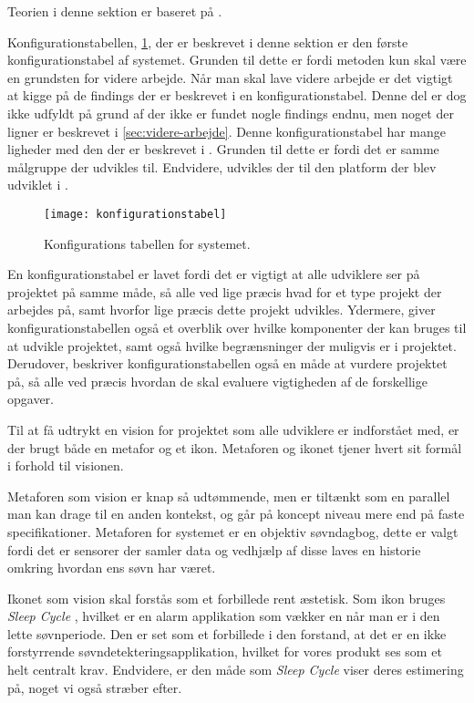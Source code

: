 Teorien i denne sektion er baseret på \citet{art:essence}.

Konfigurationstabellen, \cref{tab:konfigurationsTabel}, der er beskrevet i denne sektion er den første konfigurationstabel af systemet.
Grunden til dette er fordi metoden kun skal være en grundsten for videre arbejde.
Når man skal lave videre arbejde er det vigtigt at kigge på de findings der er beskrevet i en konfigurationstabel.
Denne del er dog ikke udfyldt på grund af der ikke er fundet nogle findings endnu, men noget der ligner er beskrevet i \cref{sec:videre-arbejde}.
Denne konfigurationstabel har mange ligheder med den der er beskrevet i \citet{misc:faellesrapp}.
Grunden til dette er fordi det er samme målgruppe der udvikles til.
Endvidere, udvikles der til den platform der blev udviklet i \citet{misc:faellesrapp}.

\begin{figure}[]
	\centering
	\texttt{[image: konfigurationstabel]}
	\caption{Konfigurations tabellen for systemet.}
	\label{tab:konfigurationsTabel}
\end{figure}

En konfigurationstabel er lavet fordi det er vigtigt at alle udviklere ser på projektet på samme måde, så alle ved lige præcis hvad for et type projekt der arbejdes på, samt hvorfor lige præcis dette projekt udvikles.
Ydermere, giver konfigurationstabellen også et overblik over hvilke komponenter der kan bruges til at udvikle projektet, samt også hvilke begrænsninger der muligvis er i projektet.
Derudover, beskriver konfigurationstabellen også en måde at vurdere projektet på, så alle ved præcis hvordan de skal evaluere vigtigheden af de forskellige opgaver.

Til at få udtrykt en vision for projektet som alle udviklere er indforstået med, er der brugt både en metafor og et ikon.
Metaforen og ikonet tjener hvert sit formål i forhold til visionen.

Metaforen som vision er knap så udtømmende, men er tiltænkt som en parallel man kan drage til en anden kontekst, og går på koncept niveau mere end på faste specifikationer.
Metaforen for systemet er en objektiv søvndagbog, dette er valgt fordi det er sensorer der samler data og vedhjælp af disse laves en historie omkring hvordan ens søvn har været.

Ikonet som vision skal forstås som et forbillede rent æstetisk.
Som ikon bruges \textit{Sleep Cycle} \citep{misc:sleepCycle}, hvilket er en alarm applikation som vækker en når man er i den lette søvnperiode.
Den er set som et forbillede i den forstand, at det er en ikke forstyrrende søvndetekteringsapplikation, hvilket for vores produkt ses som et helt centralt krav.
Endvidere, er den måde som \textit{Sleep Cycle} viser deres estimering på, noget vi også stræber efter.